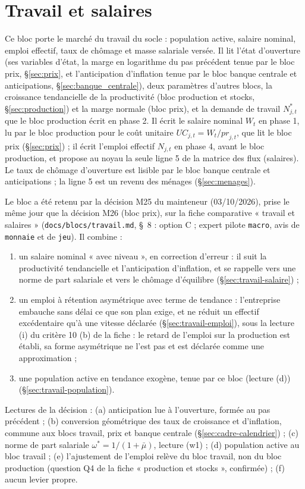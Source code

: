 \documentclass[11pt,a4paper]{article}
\begin{document}
\section{Travail et salaires}
\label{sec:travail}
Ce bloc porte le marché du travail du socle : population active, salaire nominal, emploi effectif, taux de chômage et masse salariale versée. Il lit l'état d'ouverture (ses variables d'état, la marge en logarithme du pas précédent tenue par le bloc prix, \S\ref{sec:prix}, et l'anticipation d'inflation tenue par le bloc banque centrale et anticipations, \S\ref{sec:banque_centrale}), deux paramètres d'autres blocs, la croissance tendancielle de la productivité (bloc production et stocks, \S\ref{sec:production}) et la marge normale (bloc prix), et la demande de travail $N^{\ast}_{j,t}$ que le bloc production écrit en phase 2. Il écrit le salaire nominal $W_t$ en phase 1, lu par le bloc production pour le coût unitaire $\mathit{UC}_{j,t} = W_t/\mathit{pr}_{j,t}$, que lit le bloc prix (\S\ref{sec:prix}) ; il écrit l'emploi effectif $N_{j,t}$ en phase 4, avant le bloc production, et propose au noyau la seule ligne 5 de la matrice des flux (salaires). Le taux de chômage d'ouverture est lisible par le bloc banque centrale et anticipations ; la ligne 5 est un revenu des ménages (\S\ref{sec:menages}).

Le bloc a été retenu par la décision M25 du mainteneur (03/10/2026), prise le même jour que la décision M26 (bloc prix), sur la fiche comparative « travail et salaires » (\nolinkurl{docs/blocs/travail.md}, \S~8 : option C ; expert pilote \texttt{macro}, avis de \texttt{monnaie} et de \texttt{jeu}). Il combine :
\begin{enumerate}[label=(\alph*)]
\item un salaire nominal « avec niveau », en correction d'erreur : il suit la productivité tendancielle et l'anticipation d'inflation, et se rappelle vers une norme de part salariale et vers le chômage d'équilibre (\S\ref{sec:travail-salaire}) ;
\item un emploi à rétention asymétrique avec terme de tendance : l'entreprise embauche sans délai ce que son plan exige, et ne réduit un effectif excédentaire qu'à une vitesse déclarée (\S\ref{sec:travail-emploi}), sous la lecture (i) du critère 10 (b) de la fiche : le retard de l'emploi sur la production est établi, sa forme asymétrique ne l'est pas et est déclarée comme une approximation ;
\item une population active en tendance exogène, tenue par ce bloc (lecture (d)) (\S\ref{sec:travail-population}).
\end{enumerate}
Lectures de la décision : (a) anticipation lue à l'ouverture, formée au pas précédent ; (b) conversion géométrique des taux de croissance et d'inflation, commune aux blocs travail, prix et banque centrale (\S\ref{sec:cadre-calendrier}) ; (c) norme de part salariale $\omega^{\ast} = 1/(1 + \bar\mu)$, lecture (w1) ; (d) population active au bloc travail ; (e) l'ajustement de l'emploi relève du bloc travail, non du bloc production (question Q4 de la fiche « production et stocks », confirmée) ; (f) aucun levier propre.
\end{document}
